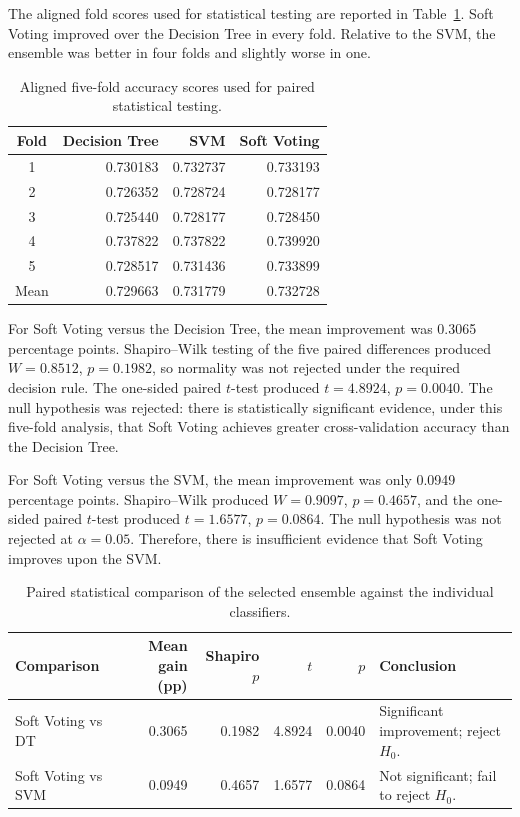 \documentclass[11pt,a4paper]{article}
\begin{document}
The aligned fold scores used for statistical testing are reported in Table~\ref{tab:paired_folds}. Soft Voting improved over the Decision Tree in every fold. Relative to the SVM, the ensemble was better in four folds and slightly worse in one.

\begin{table}[H]
\centering
\small
\begin{tabular}{crrr}
\toprule
\textbf{Fold} & \textbf{Decision Tree} & \textbf{SVM} & \textbf{Soft Voting}\\
\midrule
1 & 0.730183 & 0.732737 & 0.733193\\
2 & 0.726352 & 0.728724 & 0.728177\\
3 & 0.725440 & 0.728177 & 0.728450\\
4 & 0.737822 & 0.737822 & 0.739920\\
5 & 0.728517 & 0.731436 & 0.733899\\
\midrule
Mean & 0.729663 & 0.731779 & 0.732728\\
\bottomrule
\end{tabular}
\caption{Aligned five-fold accuracy scores used for paired statistical testing.}
\label{tab:paired_folds}
\end{table}

For Soft Voting versus the Decision Tree, the mean improvement was 0.3065 percentage points. Shapiro--Wilk testing of the five paired differences produced $W=0.8512$, $p=0.1982$, so normality was not rejected under the required decision rule. The one-sided paired $t$-test produced $t=4.8924$, $p=0.0040$. The null hypothesis was rejected: there is statistically significant evidence, under this five-fold analysis, that Soft Voting achieves greater cross-validation accuracy than the Decision Tree.

For Soft Voting versus the SVM, the mean improvement was only 0.0949 percentage points. Shapiro--Wilk produced $W=0.9097$, $p=0.4657$, and the one-sided paired $t$-test produced $t=1.6577$, $p=0.0864$. The null hypothesis was not rejected at $\alpha=0.05$. Therefore, there is insufficient evidence that Soft Voting improves upon the SVM.

\begin{table}[htbp]
\centering
\small
\begin{tabularx}{\textwidth}{@{}lrrrrX@{}}
\toprule
\textbf{Comparison} & \textbf{Mean gain (pp)} & \textbf{Shapiro $p$} & \textbf{$t$} & \textbf{$p$} & \textbf{Conclusion}\\
\midrule
Soft Voting vs DT & 0.3065 & 0.1982 & 4.8924 & 0.0040 & Significant improvement; reject $H_0$.\\
Soft Voting vs SVM & 0.0949 & 0.4657 & 1.6577 & 0.0864 & Not significant; fail to reject $H_0$.\\
\bottomrule
\end{tabularx}
\caption{Paired statistical comparison of the selected ensemble against the individual classifiers.}
\label{tab:stats}
\end{table}
\end{document}
